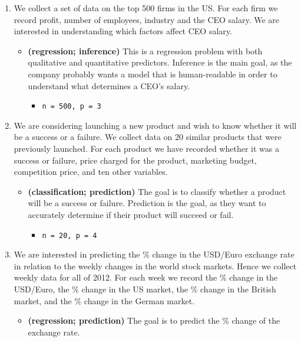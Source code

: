 \documentclass[]{book}
\providecommand{\tightlist}{%
  \setlength{\itemsep}{0pt}\setlength{\parskip}{0pt}}
\begin{document}
\begin{enumerate}
\def\labelenumi{(\alph{enumi})}
\tightlist
\item
  We collect a set of data on the top 500 firms in the US. For each firm we record profit, number of employees, industry and the CEO salary. We are interested in understanding which factors affect CEO salary.

  \begin{itemize}
  \tightlist
  \item
    \textbf{(regression; inference)} This is a regression problem with both qualitative and quantitative predictors. Inference is the main goal, as the company probably wants a model that is human-readable in order to understand what determines a CEO's salary.

    \begin{itemize}
    \tightlist
    \item
      \texttt{n\ =\ 500,\ p\ =\ 3}
    \end{itemize}
  \end{itemize}
\item
  We are considering launching a new product and wish to know whether it will be a success or a failure. We collect data on 20 similar products that were previously launched. For each product we have recorded whether it was a success or failure, price charged for the product, marketing budget, competition price, and ten other variables.

  \begin{itemize}
  \tightlist
  \item
    \textbf{(classification; prediction)} The goal is to classify whether a product will be a success or failure. Prediction is the goal, as they want to accurately determine if their product will succeed or fail.

    \begin{itemize}
    \tightlist
    \item
      \texttt{n\ =\ 20,\ p\ =\ 4}
    \end{itemize}
  \end{itemize}
\item
  We are interested in predicting the \% change in the USD/Euro exchange rate in relation to the weekly changes in the world stock markets. Hence we collect weekly data for all of 2012. For each week we record the \% change in the USD/Euro, the \% change in the US market, the \% change in the British market, and the \% change in the German market.

  \begin{itemize}
  \tightlist
  \item
    \textbf{(regression; prediction)} The goal is to predict the \% change of the exchange rate.
  \end{itemize}
\end{enumerate}
\end{document}
